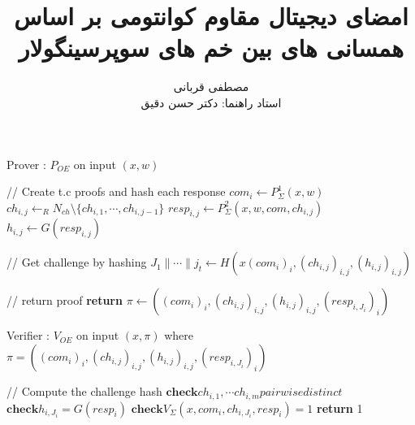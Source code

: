 \documentclass[12pt,a4paper]{article}
\title{امضای دیجیتال مقاوم کوانتومی بر اساس همسانی های بین خم های سوپرسینگولار}
\author{مصطفی قربانی
	\\[1cm]{ استاد راهنما: دکتر حسن دقیق}}
\date{}
\begin{document}
\maketitle


\begin{algorithm}\label{algorithm_1}
	\caption{Prover : $P_{OE}$ on input $(x,w)$}
	\begin{algorithmic}[1]
		\State // Create t.c proofs and hash each response
			\State $com_i \leftarrow P_{\Sigma}^{1}(x,w)$
				\State $ch_{i,j} \leftarrow_{R} N_{ch} \setminus \{ch_{i,1} , \cdots , ch_{i,j-1} \}$
				\State $resp_{i,j} \leftarrow P_{\Sigma}^2 (x,w,com,ch_{i,j})$
				\State $h_{i,j} \leftarrow G(resp_{i,j})$ 
			\EndFor 
		\EndFor
		
		\State // Get challenge by hashing
		\State $ J_1 \parallel \cdots \parallel j_t \leftarrow H(x(com_i)_i , (ch_{i,j})_{i,j} , (h_{i,j})_{i,j}   ) $ 
		
		\State // return proof
		\State \textbf{return} $\pi \leftarrow ( (com_i)_i , (ch_{i,j})_{i,j} , (h_{i,j})_{i,j} , (resp_{i,J_i})_i  )$ 
	\end{algorithmic}
\end{algorithm}




\begin{algorithm}\label{algorithm_2}
	\caption{Verifier : $V_{OE}$ on input $(x,\pi) $
		where \newline
		\qquad $\pi =  ( (com_i)_i , (ch_{i,j})_{i,j} , (h_{i,j})_{i,j} , (resp_{i,J_i})_i  )$
		}
	\begin{algorithmic}[1]
		\State // Compute the challenge hash
		\State $ \textbf{check} ch_{i,1} , \cdots ch_{i,m} pairwise distinct $
		\State $ \textbf{check} h_{i,J_i} = G(resp_i) $
		\State $ \textbf{check} V_{\Sigma}(x,com_i,ch_{i,J_i} , resp_i) = 1 $
		\EndFor
		\textbf{return} 1
		\EndIf
		
	\end{algorithmic}
\end{algorithm}
\end{document}
